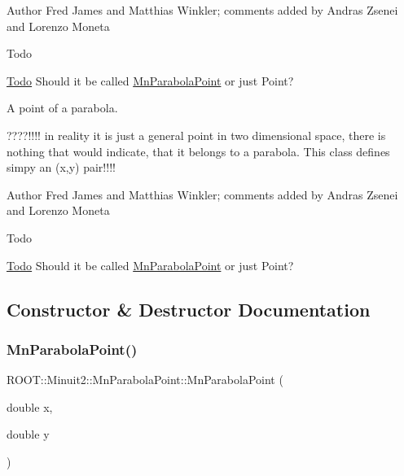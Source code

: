\begin{DoxyAuthor}{Author}
Fred James and Matthias Winkler; comments added by Andras Zsenei and Lorenzo Moneta
\end{DoxyAuthor}
\begin{DoxyRefDesc}{Todo}
\item[\mbox{\hyperlink{todo__todo000011}{Todo}}]Should it be called \mbox{\hyperlink{classROOT_1_1Minuit2_1_1MnParabolaPoint}{Mn\+Parabola\+Point}} or just Point?\end{DoxyRefDesc}


A point of a parabola.

????!!!! in reality it is just a general point in two dimensional space, there is nothing that would indicate, that it belongs to a parabola. This class defines simpy an (x,y) pair!!!!

\begin{DoxyAuthor}{Author}
Fred James and Matthias Winkler; comments added by Andras Zsenei and Lorenzo Moneta
\end{DoxyAuthor}
\begin{DoxyRefDesc}{Todo}
\item[\mbox{\hyperlink{todo__todo000023}{Todo}}]Should it be called \mbox{\hyperlink{classROOT_1_1Minuit2_1_1MnParabolaPoint}{Mn\+Parabola\+Point}} or just Point?\end{DoxyRefDesc}


\subsection{Constructor \& Destructor Documentation}
\mbox{\label{classROOT_1_1Minuit2_1_1MnParabolaPoint_a6ce250c4449c7ca37c2772462a88190b}} 
\subsubsection{\texorpdfstring{MnParabolaPoint()}{MnParabolaPoint()}\hspace{0.1cm}{\footnotesize\ttfamily [1/2]}}
{\footnotesize\ttfamily R\+O\+O\+T\+::\+Minuit2\+::\+Mn\+Parabola\+Point\+::\+Mn\+Parabola\+Point (\begin{DoxyParamCaption}\item[{double}]{x,  }\item[{double}]{y }\end{DoxyParamCaption})\hspace{0.3cm}{\ttfamily [inline]}}

